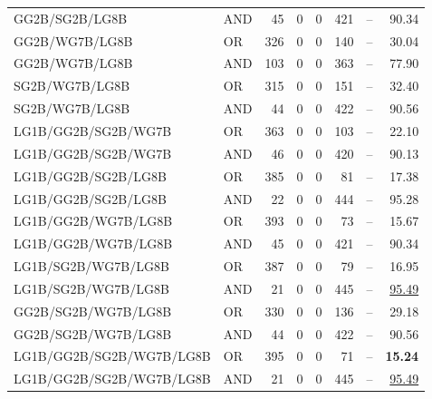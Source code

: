 \documentclass{article}
\begin{document}
{\begin{longtable}{llrrrrrr}
 GG2B/SG2B/LG8B           & AND     &   45 &    0 &    0 &  421 & --    & 90.34             \\
 GG2B/WG7B/LG8B           & OR      &  326 &    0 &    0 &  140 & --    & 30.04             \\
 GG2B/WG7B/LG8B           & AND     &  103 &    0 &    0 &  363 & --    & 77.90             \\
 SG2B/WG7B/LG8B           & OR      &  315 &    0 &    0 &  151 & --    & 32.40             \\
 SG2B/WG7B/LG8B           & AND     &   44 &    0 &    0 &  422 & --    & 90.56             \\
 LG1B/GG2B/SG2B/WG7B      & OR      &  363 &    0 &    0 &  103 & --    & 22.10             \\
 LG1B/GG2B/SG2B/WG7B      & AND     &   46 &    0 &    0 &  420 & --    & 90.13             \\
 LG1B/GG2B/SG2B/LG8B      & OR      &  385 &    0 &    0 &   81 & --    & 17.38             \\
 LG1B/GG2B/SG2B/LG8B      & AND     &   22 &    0 &    0 &  444 & --    & 95.28             \\
 LG1B/GG2B/WG7B/LG8B      & OR      &  393 &    0 &    0 &   73 & --    & 15.67             \\
 LG1B/GG2B/WG7B/LG8B      & AND     &   45 &    0 &    0 &  421 & --    & 90.34             \\
 LG1B/SG2B/WG7B/LG8B      & OR      &  387 &    0 &    0 &   79 & --    & 16.95             \\
 LG1B/SG2B/WG7B/LG8B      & AND     &   21 &    0 &    0 &  445 & --    & \underline{95.49} \\
 GG2B/SG2B/WG7B/LG8B      & OR      &  330 &    0 &    0 &  136 & --    & 29.18             \\
 GG2B/SG2B/WG7B/LG8B      & AND     &   44 &    0 &    0 &  422 & --    & 90.56             \\
 LG1B/GG2B/SG2B/WG7B/LG8B & OR      &  395 &    0 &    0 &   71 & --    & \textbf{15.24}    \\
 LG1B/GG2B/SG2B/WG7B/LG8B & AND     &   21 &    0 &    0 &  445 & --    & \underline{95.49} \\

\end{longtable}
}

\end{document}
